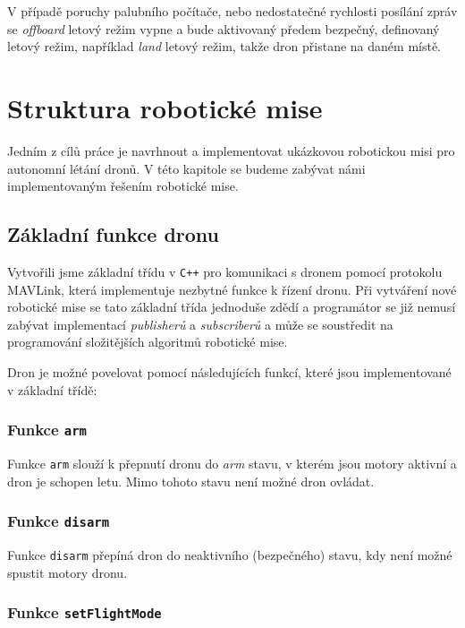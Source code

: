 V případě poruchy palubního počítače, nebo nedostatečné rychlosti posílání zpráv se \textit{offboard} letový režim vypne a bude aktivovaný předem bezpečný, definovaný letový režim, například \textit{land} letový režim, takže dron přistane na daném místě. \cite{PX4docs}

\section{Struktura robotické mise}

Jedním z cílů práce je navrhnout a implementovat ukázkovou robotickou misi pro autonomní létání dronů. V této kapitole se budeme zabývat námi implementovaným řešením robotické mise.

\subsection{Základní funkce dronu}

Vytvořili jsme základní třídu  v \texttt{C++} pro komunikaci s dronem pomocí protokolu MAVLink, která implementuje nezbytné funkce k řízení dronu. Při vytváření nové robotické mise se tato základní třída jednoduše zdědí a programátor se již nemusí zabývat implementací \textit{publisherů} a \textit{subscriberů} a může se soustředit na programování složitějších algoritmů robotické mise.

Dron je možné povelovat pomocí následujících funkcí, které jsou implementované v základní třídě:

\subsubsection{Funkce \texttt{arm}}

Funkce \texttt{arm} slouží k přepnutí dronu do \textit{arm} stavu, v kterém jsou motory aktivní a dron je schopen letu. Mimo tohoto stavu není možné dron ovládat. 

\subsubsection{Funkce \texttt{disarm}}

Funkce \texttt{disarm} přepíná dron do neaktivního (bezpečného) stavu, kdy není možné spustit motory dronu.

\subsubsection{Funkce \texttt{setFlightMode}}

